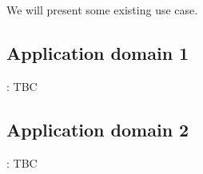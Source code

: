 
We will present some existing use case. 


\subsection{Application domain 1} : TBC
\subsection{Application domain 2} : TBC